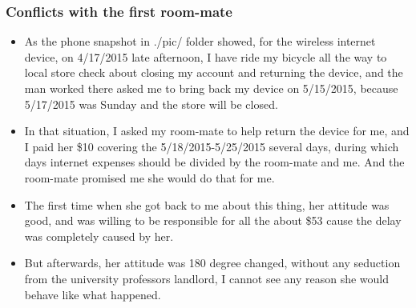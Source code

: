 \documentclass[9pt,b5paper]{article}
\begin{document}
\subsubsection{Conflicts with the first room-mate}
\label{sec-2-3-3}
\begin{itemize}
\item As the phone snapshot in ./pic/ folder showed, for the wireless internet device, on 4/17/2015 late afternoon, I have ride my bicycle all the way to local store check about closing my account and returning the device, and the man worked there asked me to bring back my device on 5/15/2015, because 5/17/2015 was Sunday and the store will be closed.
\item In that situation, I asked my room-mate to help return the device for me, and I paid her \$10 covering the 5/18/2015-5/25/2015 several days, during which days internet expenses should be divided by the room-mate and me. And the room-mate promised me she would do that for me.
\item The first time when she got back to me about this thing, her attitude was good, and was willing to be responsible for all the about \$53 cause the delay was completely caused by her.
\item But afterwards, her attitude was 180 degree changed, without any seduction from the university professors landlord, I cannot see any reason she would behave like what happened. 


\end{itemize}
\end{document}
